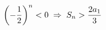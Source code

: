 \documentclass[preview]{standalone}
\begin{document}
\begin{align*}
\special{dvisvgm:raw <g id='unique000'>}\left(-\frac{1}{2}\right)^n<0 \;\Rightarrow\; S_n>\frac{2a_1}{3}\special{dvisvgm:raw </g>}
\end{align*}
\end{document}
